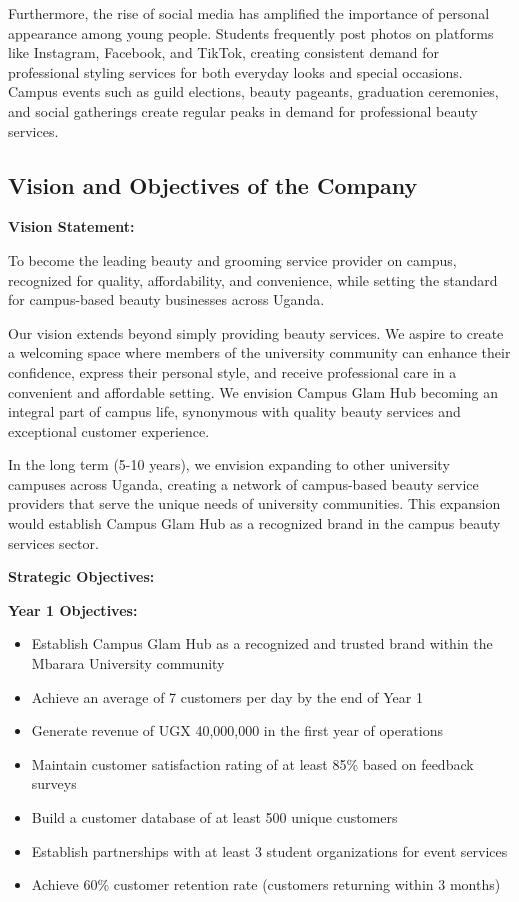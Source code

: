 \documentclass[a4paper,12pt]{article}
\begin{document}
Furthermore, the rise of social media has amplified the importance of personal appearance among young people. Students frequently post photos on platforms like Instagram, Facebook, and TikTok, creating consistent demand for professional styling services for both everyday looks and special occasions. Campus events such as guild elections, beauty pageants, graduation ceremonies, and social gatherings create regular peaks in demand for professional beauty services.

\subsection{Vision and Objectives of the Company}

\textbf{Vision Statement:}

To become the leading beauty and grooming service provider on campus, recognized for quality, affordability, and convenience, while setting the standard for campus-based beauty businesses across Uganda.

Our vision extends beyond simply providing beauty services. We aspire to create a welcoming space where members of the university community can enhance their confidence, express their personal style, and receive professional care in a convenient and affordable setting. We envision Campus Glam Hub becoming an integral part of campus life, synonymous with quality beauty services and exceptional customer experience.

In the long term (5-10 years), we envision expanding to other university campuses across Uganda, creating a network of campus-based beauty service providers that serve the unique needs of university communities. This expansion would establish Campus Glam Hub as a recognized brand in the campus beauty services sector.

\textbf{Strategic Objectives:}

\textbf{Year 1 Objectives:}
\begin{itemize}[leftmargin=2em]
    \item Establish Campus Glam Hub as a recognized and trusted brand within the Mbarara University community
    \item Achieve an average of 7 customers per day by the end of Year 1
    \item Generate revenue of UGX 40,000,000 in the first year of operations
    \item Maintain customer satisfaction rating of at least 85\% based on feedback surveys
    \item Build a customer database of at least 500 unique customers
    \item Establish partnerships with at least 3 student organizations for event services
    \item Achieve 60\% customer retention rate (customers returning within 3 months)
\end{itemize}
\end{document}
